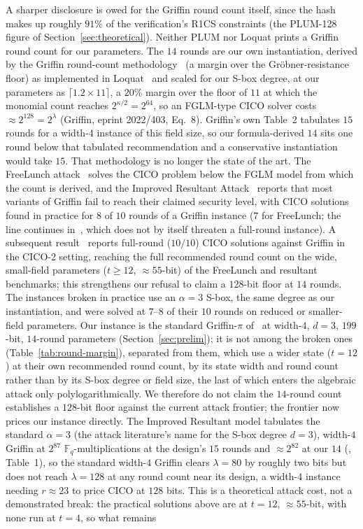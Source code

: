 A sharper disclosure is owed for the Griffin round count itself, since the hash makes up roughly $91\%$ of the verification's R1CS constraints (the PLUM-128 figure of Section~\ref{sec:theoretical}). Neither PLUM nor Loquat prints a Griffin round count for our parameters. The $14$ rounds are our own instantiation, derived by the Griffin round-count methodology~\cite{cryptoeprint:2022/403} (a margin over the Gr\"{o}bner-resistance floor) as implemented in Loquat~\cite{cryptoeprint:2024/868} and scaled for our S-box degree, at our parameters as $\lceil 1.2\times 11\rceil$, a $20\%$ margin over the floor of $11$ at which the monomial count reaches $2^{\kappa/2}=2^{64}$, so an FGLM-type CICO solver costs $\approx 2^{128}=2^{\lambda}$ (Griffin, eprint 2022/403, Eq.~8). Griffin's own Table~2 tabulates $15$ rounds for a width-$4$ instance of this field size, so our formula-derived $14$ sits one round below that tabulated recommendation and a conservative instantiation would take $15$. That methodology is no longer the state of the art. The FreeLunch attack~\cite{freelunch2024} solves the CICO problem below the FGLM model from which the count is derived, and the Improved Resultant Attack~\cite{resultant2025} reports that most variants of Griffin fail to reach their claimed security level, with CICO solutions found in practice for $8$ of $10$ rounds of a Griffin instance ($7$ for FreeLunch; the line continues in~\cite{cheaplunch2025}, which does not by itself threaten a full-round instance). A subsequent result~\cite{bak2026resultants} reports full-round ($10/10$) CICO solutions against Griffin in the {CICO}-2 setting, reaching the full recommended round count on the wide, small-field parameters ($t\ge 12$, ${\approx}55$-bit) of the FreeLunch and resultant benchmarks; this strengthens our refusal to claim a $128$-bit floor at $14$ rounds. The instances broken in practice use an $\alpha=3$ S-box, the same degree as our instantiation, and were solved at $7$--$8$ of their $10$ rounds on reduced or smaller-field parameters. Our instance is the standard Griffin-$\pi$ of~\cite{cryptoeprint:2022/403} at width-$4$, $d{=}3$, $199$-bit, $14$-round parameters (Section~\ref{sec:prelim}); it is not among the broken ones (Table~\ref{tab:round-margin}), separated from them, which use a wider state ($t{=}12$) at their own recommended round count, by its state width and round count rather than by its S-box degree or field size, the last of which enters the algebraic attack only polylogarithmically. We therefore do not claim the $14$-round count establishes a $128$-bit floor against the current attack frontier; the frontier now prices our instance directly. The Improved Resultant model tabulates the standard $\alpha=3$ (the attack literature's name for the S-box degree $d=3$), width-$4$ Griffin at $2^{87}$ $\mathbb{F}_q$-multiplications at the design's $15$ rounds and $\approx 2^{82}$ at our $14$ (\cite{resultant2025}, Table~1), so the standard width-$4$ Griffin clears $\lambda=80$ by roughly two bits but does not reach $\lambda=128$ at any round count near its design, a width-$4$ instance needing $r\approx 23$ to price CICO at $128$ bits. This is a theoretical attack cost, not a demonstrated break: the practical solutions above are at $t=12$, ${\approx}55$-bit, with none run at $t=4$, so what remains 
